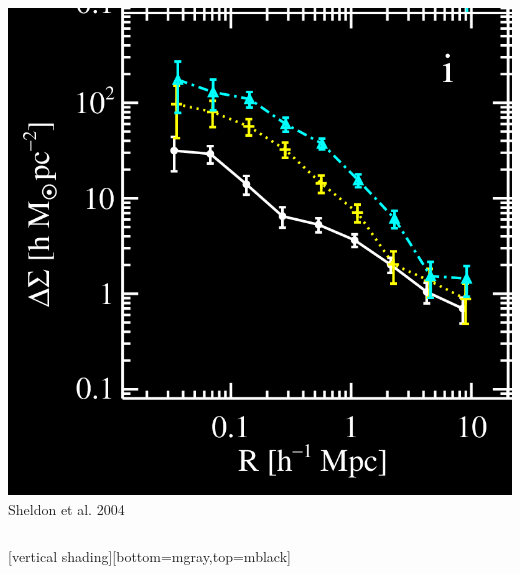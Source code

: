 \documentclass{beamer}
\begin{document}
{{\begin{columns}
\begin{column}{0.5\textwidth}
                \includegraphics[trim=0 0 0 8,clip,width=\textwidth]{deltasig_all_allband_bylum_icolor_crop.png}
                \newline
                {\color{gold}Sheldon et al. 2004}
            \end{column}
        \end{columns}
    }

    [vertical shading][bottom=mgray,top=mblack]
}
\end{document}
